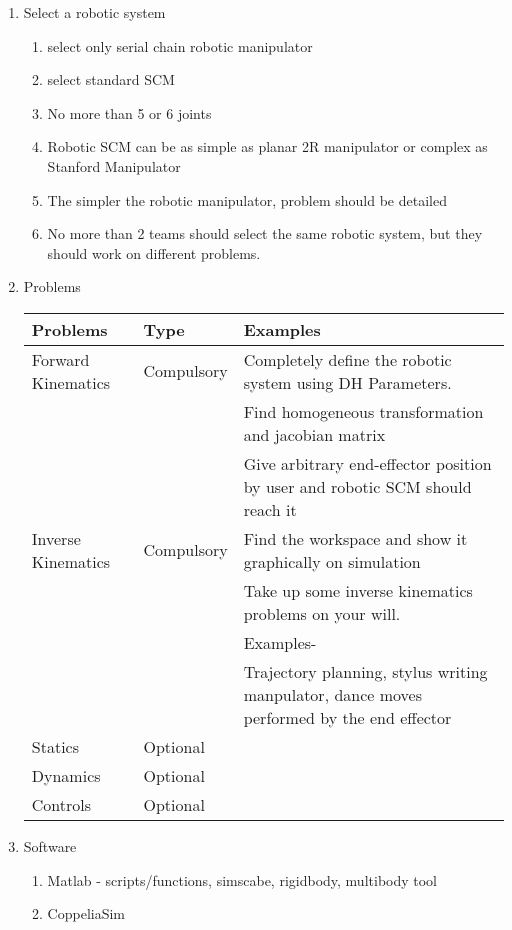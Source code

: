 \documentclass[11pt]{report}
\begin{document}
\begin{enumerate}
\item Select a robotic system
\begin{enumerate}
\item select only serial chain robotic manipulator
\item select standard SCM
\item No more than 5 or 6 joints
\item Robotic SCM can be as simple as planar 2R manipulator or complex as Stanford Manipulator
\item The simpler the robotic manipulator, problem should be detailed
\item No more than 2 teams should select the same robotic system, but they should work on different problems.
\end{enumerate}
\item Problems
\begin{center}
\begin{tabular}{lll}
\hline
Problems & Type & Examples\\
\hline
Forward Kinematics & Compulsory & Completely define the robotic system using DH Parameters.\\
 &  & Find homogeneous transformation and jacobian matrix\\
 &  & Give arbitrary end-effector position by user and robotic SCM should reach it\\
\hline
Inverse Kinematics & Compulsory & Find the workspace and show it graphically on simulation\\
 &  & Take up some inverse kinematics problems on your will.\\
 &  & Examples-\\
 &  & Trajectory planning, stylus writing manpulator, dance moves performed by the end effector\\
\hline
Statics & Optional & \\
Dynamics & Optional & \\
Controls & Optional & \\
\hline
\end{tabular}
\end{center}
\item Software
\begin{enumerate}
\item Matlab - scripts/functions, simscabe, rigidbody, multibody tool
\item CoppeliaSim
\end{enumerate}
\end{enumerate}
\end{document}
